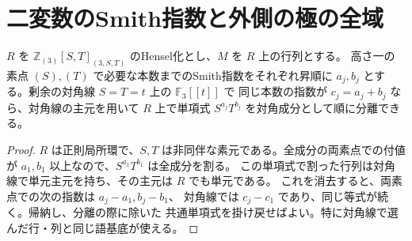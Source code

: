 \section{二変数のSmith指数と外側の極の全域}
\label{sec:rank-fifteen-outer-pole-fan}
\begin{lemma}\label{lem:rank-fifteen-two-parameter-smith}
$R$ を $\mathbb Z_{(3)}[S,T]_{(3,S,T)}$ のHensel化とし、$M$ を $R$ 上の行列とする。
高さ一の素点 $(S),(T)$ で必要な本数までのSmith指数をそれぞれ昇順に
$a_j,b_j$ とする。剰余の対角線 $S=T=t$ 上の $\mathbb F_3[[t]]$ で
同じ本数の指数が $c_j=a_j+b_j$ なら、対角線の主元を用いて
$R$ 上で単項式 $S^{a_j}T^{b_j}$ を対角成分として順に分離できる。
\end{lemma}
\begin{proof}
$R$ は正則局所環で、$S,T$ は非同伴な素元である。全成分の両素点での付値が
$a_1,b_1$ 以上なので、$S^{a_1}T^{b_1}$ は全成分を割る。
この単項式で割った行列は対角線で単元主元を持ち、その主元は $R$ でも単元である。
これを消去すると、両素点での次の指数は $a_j-a_1,b_j-b_1$、
対角線では $c_j-c_1$ であり、同じ等式が続く。帰納し、分離の際に除いた
共通単項式を掛け戻せばよい。特に対角線で選んだ行・列と同じ語基底が使える。
\end{proof}

